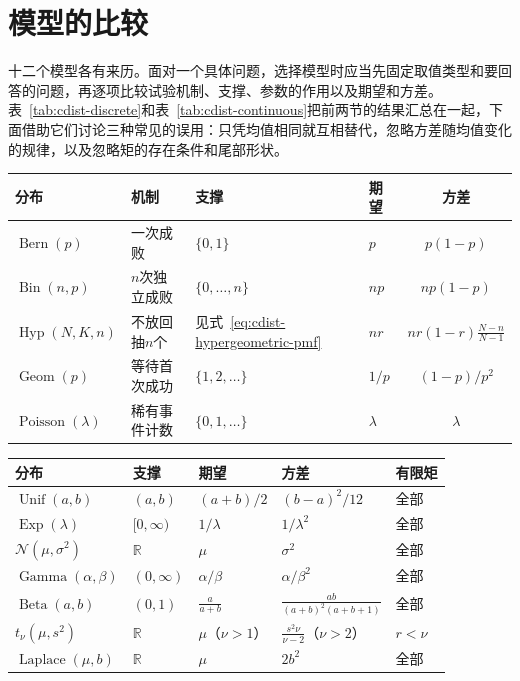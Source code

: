\section{模型的比较}
\label{sec:cdist-comparison}

十二个模型各有来历。面对一个具体问题，选择模型时应当先固定取值类型和要回答的问题，再逐项比较试验机制、支撑、参数的作用以及期望和方差。表~\ref{tab:cdist-discrete}和表~\ref{tab:cdist-continuous}把前两节的结果汇总在一起，下面借助它们讨论三种常见的误用：只凭均值相同就互相替代，忽略方差随均值变化的规律，以及忽略矩的存在条件和尾部形状。

\begin{BookInlineTable}
  \centering
  \caption{离散模型。超几何分布一行中$r=K/N$，方差公式要求$N>1$。}
  \label{tab:cdist-discrete}
  \begin{tabular}{llllc}
    \toprule
    分布 & 机制 & 支撑 & 期望 & 方差\\
    \midrule
    $\operatorname{Bern}(p)$ & 一次成败 & $\{0,1\}$ & $p$ & $p(1-p)$\\
    $\operatorname{Bin}(n,p)$ & $n$次独立成败 & $\{0,\dots,n\}$ & $np$ & $np(1-p)$\\
    $\operatorname{Hyp}(N,K,n)$ & 不放回抽$n$个 & 见式~\eqref{eq:cdist-hypergeometric-pmf} & $nr$ & $nr(1-r)\frac{N-n}{N-1}$\\
    $\operatorname{Geom}(p)$ & 等待首次成功 & $\{1,2,\dots\}$ & $1/p$ & $(1-p)/p^{2}$\\
    $\operatorname{Poisson}(\lambda)$ & 稀有事件计数 & $\{0,1,\dots\}$ & $\lambda$ & $\lambda$\\
    \bottomrule
  \end{tabular}
\end{BookInlineTable}

\begin{BookInlineTable}
  \centering
  \caption{连续模型。最后一列是有限的绝对矩$\mathbb{E}\lvert X\rvert^{r}$所允许的阶数$r>0$。}
  \label{tab:cdist-continuous}
  \begin{tabular}{lllll}
    \toprule
    分布 & 支撑 & 期望 & 方差 & 有限矩\\
    \midrule
    $\operatorname{Unif}(a,b)$ & $(a,b)$ & $(a+b)/2$ & $(b-a)^{2}/12$ & 全部\\
    $\operatorname{Exp}(\lambda)$ & $[0,\infty)$ & $1/\lambda$ & $1/\lambda^{2}$ & 全部\\
    $\mathcal{N}(\mu,\sigma^{2})$ & $\mathbb{R}$ & $\mu$ & $\sigma^{2}$ & 全部\\
    $\operatorname{Gamma}(\alpha,\beta)$ & $(0,\infty)$ & $\alpha/\beta$ & $\alpha/\beta^{2}$ & 全部\\
    $\operatorname{Beta}(a,b)$ & $(0,1)$ & $\frac{a}{a+b}$ & $\frac{ab}{(a+b)^{2}(a+b+1)}$ & 全部\\
    $t_{\nu}(\mu,s^{2})$ & $\mathbb{R}$ & $\mu$（$\nu>1$） & $\frac{s^{2}\nu}{\nu-2}$（$\nu>2$） & $r<\nu$\\
    $\operatorname{Laplace}(\mu,b)$ & $\mathbb{R}$ & $\mu$ & $2b^{2}$ & 全部\\
    \bottomrule
  \end{tabular}
\end{BookInlineTable}

